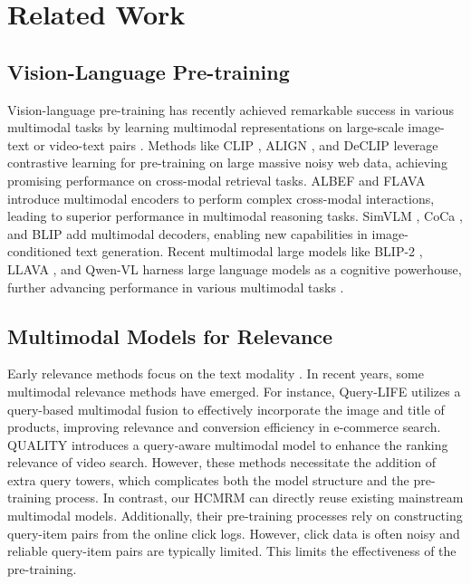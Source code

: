 \section{Related Work}
\subsection{Vision-Language Pre-training}
Vision-language pre-training has recently achieved remarkable success in various multimodal tasks by learning multimodal representations on large-scale image-text or video-text pairs \cite{Radford2021LearningTV, Fang2022EVAET, Li2021AlignBF, Bain2021FrozenIT, Luo2021CLIP4ClipAE, Mu2021SLIPSM, Ma2022XCLIPEM, Huang2022CloverTA, Xu2021VideoCLIPCP, Chen2023InternVS, Xu2023mPLUG2AM, Liu2023VisualIT, li2024llava}. 
Methods like CLIP \cite{Radford2021LearningTV}, ALIGN \cite{Jia2021ScalingUV}, and DeCLIP \cite{Li2021SupervisionEE} leverage contrastive learning for pre-training on large massive noisy web data, achieving promising performance on cross-modal retrieval tasks. 
ALBEF \cite{Li2021AlignBF} and FLAVA \cite{Singh2021FLAVAAF} introduce multimodal encoders to perform complex cross-modal interactions, leading to superior performance in multimodal reasoning tasks. SimVLM \cite{Wang2021SimVLMSV}, CoCa \cite{Yu2022CoCaCC}, and BLIP \cite{Li2022BLIPBL} add multimodal decoders, enabling new capabilities in image-conditioned text generation. Recent multimodal large models like BLIP-2 \cite{Li2023BLIP2BL}, LLAVA \cite{li2024llava}, and Qwen-VL  \cite{Bai2023QwenVLAV} harness large language models as a cognitive powerhouse, further advancing performance in various multimodal tasks \cite{Zhang2024MMLLMsRA, Yin2023ASO}.

\subsection{Multimodal Models for Relevance}
Early relevance methods focus on the text modality \cite{Yao2021LearningAP, Chang2021ExtremeML, Zou2021PretrainedLM, Liu2021Que2SearchFA}. In recent years, some multimodal relevance methods have emerged. For instance, Query-LIFE \cite{Zhu2023QueryLIFEQL} utilizes a query-based multimodal fusion to effectively incorporate the image and title of products, improving relevance and conversion efficiency in e-commerce search. QUALITY \cite{Ye2023QueryawareMB} introduces a query-aware multimodal model to enhance the ranking relevance of video search. However, these methods necessitate the addition of extra query towers, which complicates both the model structure and the pre-training process. In contrast, our HCMRM can directly reuse existing mainstream multimodal models. Additionally, their pre-training processes rely on constructing query-item pairs from the online click logs. However, click data is often noisy and reliable query-item pairs are typically limited. This limits the effectiveness of the pre-training.

